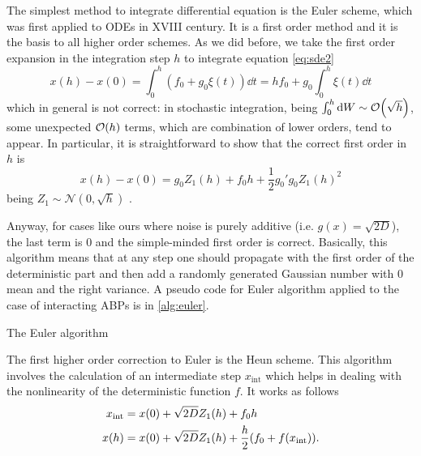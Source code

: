 \documentclass[../../master_thesis_np.tex]{subfiles}
\begin{document}
		The simplest method to integrate differential equation is the Euler scheme, which was first applied to ODEs in XVIII century. 
		It is a first order method and it is the basis to all higher order schemes. 
		As we did before, we take the first order expansion in the integration step $h$ to integrate equation \ref{eq:sde2}
		\begin{equation}
		x(h) - x(0) = \int_0^h (f_0 + g_0 \xi(t)) \dd{t} = h f_0 + g_0 \int_0^h \xi(t) \dd{t}
		\end{equation}
		which in general is not correct: in stochastic integration, being $\int_{0}^{h} \dd{W} \sim \order{\sqrt{h}}$, some unexpected $\order{h}$ terms, which are combination of lower orders, tend to appear. 
		In particular, it is straightforward to show that the correct first order in $h$ is 
		\begin{equation}
		x(h) - x(0) = g_0 Z_1(h) + f_0 h + \frac{1}{2} g_0' g_0 Z_1(h)^2
		\end{equation}
		being $Z_1\sim \mathcal{N}(0,\sqrt{h})$ \cite{mannella_integration_2011}. 
		
		Anyway, for cases like ours where noise is purely additive (i.e. $g(x) = \sqrt{2D}$), the last term is $0$ and the simple-minded first order is correct. 
		Basically, this algorithm means that at any step one should propagate with the first order of the deterministic part and then add a randomly generated Gaussian number with 0 mean and the right variance. 
		A pseudo code for Euler algorithm applied to the case of interacting ABPs is in \ref{alg:euler}.
		
		\begin{algorithm}
			\caption{The Euler algorithm} \label{alg:euler}	
			\begin{algorithmic}[1]
				\EndFor
				\EndFor
			\end{algorithmic}
		\end{algorithm}
		
		The first higher order correction to Euler is the Heun scheme. 
		This algorithm involves the calculation of an intermediate step $x_{\text{int}}$ which helps in dealing with the nonlinearity of the deterministic function $f$. It works as follows
		\begin{equation}
			\begin{aligned}
				x_{\text{int}} &= x(0) + \sqrt{2D} Z_1(h) + f_0 h\\
				x(h) &= x(0) + \sqrt{2D} Z_1(h) + \frac{h}{2} \qty(f_0 + f(x_{\text{int}})).
			\end{aligned}
		\end{equation}
		
\end{document}
